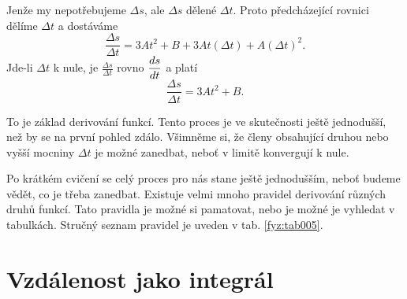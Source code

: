     Jenže my nepotřebujeme \(\Delta s\), ale \(\Delta s\) dělené \(\Delta t\). Proto předcházející 
    rovnici dělíme \(\Delta t\) a dostáváme
    \begin{equation}\label{FYZ:eq121}
       \frac{\Delta s}{\Delta t} = 3At^2 + B + 3At(\Delta t) + A(\Delta t)^2.
    \end{equation}
    Jde-li \(\Delta t\) k nule, je \(\frac{\Delta s}{\Delta t}\) rovno \(\dfrac{d s}{d t}\) a platí
    \begin{equation}\label{FYZ:eq122}
       \frac{\Delta s}{\Delta t} = 3At^2 + B.
    \end{equation}
    
    To je základ derivování funkcí. Tento proces je ve skutečnosti ještě jednodušší, než by se na 
    první pohled zdálo. Všimněme si, že členy obsahující druhou nebo vyšší mocniny \(\Delta t\) je 
    možné zanedbat, neboť v limitě konvergují k nule.
    
    Po krátkém cvičení se celý proces pro nás stane ještě jednodušším, neboť budeme vědět, co je 
    třeba zanedbat. Existuje velmi mnoho pravidel derivování různých druhů funkcí. Tato pravidla je 
    možné si pamatovat, nebo je možné je vyhledat v tabulkách. Stručný seznam pravidel je uveden v 
    tab. \ref{fyz:tab005}.
  
  \newpage
  \section{Vzdálenost jako integrál}


